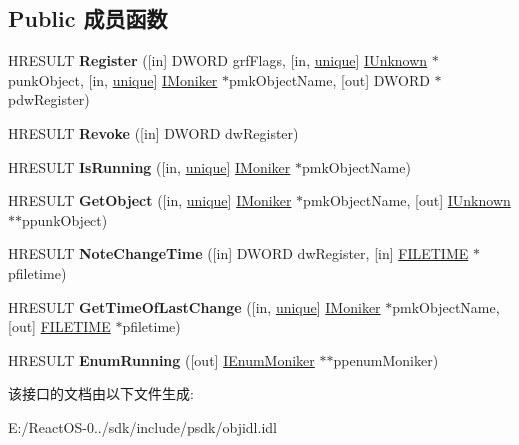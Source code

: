 \subsection*{Public 成员函数}
\begin{DoxyCompactItemize}
\item 
\mbox{\label{interface_i_running_object_table_aadc614e7ee9042b42cac874d1699bed8}} 
H\+R\+E\+S\+U\+LT {\bfseries Register} (\mbox{[}in\mbox{]} D\+W\+O\+RD grf\+Flags, \mbox{[}in, \hyperlink{interfaceunique}{unique}\mbox{]} \hyperlink{interface_i_unknown}{I\+Unknown} $\ast$punk\+Object, \mbox{[}in, \hyperlink{interfaceunique}{unique}\mbox{]} \hyperlink{interface_i_moniker}{I\+Moniker} $\ast$pmk\+Object\+Name, \mbox{[}out\mbox{]} D\+W\+O\+RD $\ast$pdw\+Register)
\item 
\mbox{\label{interface_i_running_object_table_ab15fe86ca3bf9acbdf50e26c0f7f7679}} 
H\+R\+E\+S\+U\+LT {\bfseries Revoke} (\mbox{[}in\mbox{]} D\+W\+O\+RD dw\+Register)
\item 
\mbox{\label{interface_i_running_object_table_a1cbf779006c88fef2eb04eeb34831d16}} 
H\+R\+E\+S\+U\+LT {\bfseries Is\+Running} (\mbox{[}in, \hyperlink{interfaceunique}{unique}\mbox{]} \hyperlink{interface_i_moniker}{I\+Moniker} $\ast$pmk\+Object\+Name)
\item 
\mbox{\label{interface_i_running_object_table_afee90bde230ba1597d409b5e2f1ecb08}} 
H\+R\+E\+S\+U\+LT {\bfseries Get\+Object} (\mbox{[}in, \hyperlink{interfaceunique}{unique}\mbox{]} \hyperlink{interface_i_moniker}{I\+Moniker} $\ast$pmk\+Object\+Name, \mbox{[}out\mbox{]} \hyperlink{interface_i_unknown}{I\+Unknown} $\ast$$\ast$ppunk\+Object)
\item 
\mbox{\label{interface_i_running_object_table_a4e5e238491083d5d3930b392a662fe1e}} 
H\+R\+E\+S\+U\+LT {\bfseries Note\+Change\+Time} (\mbox{[}in\mbox{]} D\+W\+O\+RD dw\+Register, \mbox{[}in\mbox{]} \hyperlink{struct___f_i_l_e_t_i_m_e}{F\+I\+L\+E\+T\+I\+ME} $\ast$pfiletime)
\item 
\mbox{\label{interface_i_running_object_table_a60f2023796288ef6934594cd02141163}} 
H\+R\+E\+S\+U\+LT {\bfseries Get\+Time\+Of\+Last\+Change} (\mbox{[}in, \hyperlink{interfaceunique}{unique}\mbox{]} \hyperlink{interface_i_moniker}{I\+Moniker} $\ast$pmk\+Object\+Name, \mbox{[}out\mbox{]} \hyperlink{struct___f_i_l_e_t_i_m_e}{F\+I\+L\+E\+T\+I\+ME} $\ast$pfiletime)
\item 
\mbox{\label{interface_i_running_object_table_a6d30063cdfd74b55e76bddc93f327a61}} 
H\+R\+E\+S\+U\+LT {\bfseries Enum\+Running} (\mbox{[}out\mbox{]} \hyperlink{interface_i_enum_moniker}{I\+Enum\+Moniker} $\ast$$\ast$ppenum\+Moniker)
\end{DoxyCompactItemize}


该接口的文档由以下文件生成\+:\begin{DoxyCompactItemize}
\item 
E\+:/\+React\+O\+S-\/0../sdk/include/psdk/objidl.\+idl\end{DoxyCompactItemize}
